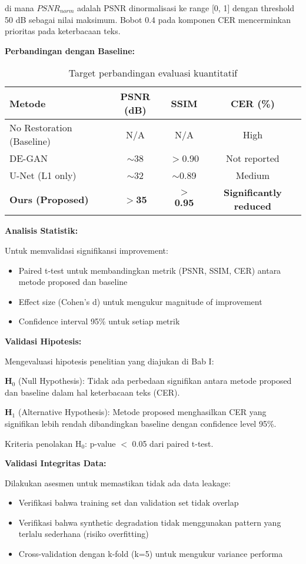 \documentclass[12pt,a4paper]{article}
\begin{document}
di mana $PSNR_{norm}$ adalah PSNR dinormalisasi ke range [0, 1] dengan threshold 50 dB sebagai nilai maksimum. Bobot 0.4 pada komponen CER mencerminkan prioritas pada keterbacaan teks.

\textbf{Perbandingan dengan Baseline:}

\begin{table}[H]
\centering
\caption{Target perbandingan evaluasi kuantitatif}
\label{tab:eval-target}
\small
\begin{tabular}{|l|c|c|c|}
\hline
\textbf{Metode} & \textbf{PSNR (dB)} & \textbf{SSIM} & \textbf{CER (\%)} \\ \hline
No Restoration (Baseline) & N/A & N/A & High \\ \hline
DE-GAN & $\sim$38 & $>$0.90 & Not reported \\ \hline
U-Net (L1 only) & $\sim$32 & $\sim$0.89 & Medium \\ \hline
\textbf{Ours (Proposed)} & \textbf{$>$35} & \textbf{$>$0.95} & \textbf{Significantly reduced} \\ \hline
\end{tabular}
\end{table}

\textbf{Analisis Statistik:}

Untuk memvalidasi signifikansi improvement:
\begin{itemize}[leftmargin=*, nosep]
\item Paired t-test untuk membandingkan metrik (PSNR, SSIM, CER) antara metode proposed dan baseline
\item Effect size (Cohen's d) untuk mengukur magnitude of improvement
\item Confidence interval 95\% untuk setiap metrik
\end{itemize}

\textbf{Validasi Hipotesis:}

Mengevaluasi hipotesis penelitian yang diajukan di Bab I:

\textbf{H$_0$} (Null Hypothesis): Tidak ada perbedaan signifikan antara metode proposed dan baseline dalam hal keterbacaan teks (CER).

\textbf{H$_1$} (Alternative Hypothesis): Metode proposed menghasilkan CER yang signifikan lebih rendah dibandingkan baseline dengan confidence level 95\%.

Kriteria penolakan H$_0$: p-value $<$ 0.05 dari paired t-test.

\textbf{Validasi Integritas Data:}

Dilakukan asesmen untuk memastikan tidak ada data leakage:
\begin{itemize}[leftmargin=*, nosep]
\item Verifikasi bahwa training set dan validation set tidak overlap
\item Verifikasi bahwa synthetic degradation tidak menggunakan pattern yang terlalu sederhana (risiko overfitting)
\item Cross-validation dengan k-fold (k=5) untuk mengukur variance performa
\end{itemize}
\end{document}
